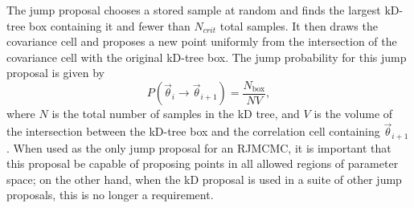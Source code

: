 \documentclass{iopart}
\newcommand{\vtheta}{\vec{\theta}}
\newcommand{\Nbox}{N_\mathrm{box}}
\newcommand{\Vbox}{V_\mathrm{box}}
\newcommand{\ee}{\end{equation}}
\newcommand{\bel}[1]{\begin{equation}\label{#1}}
\newcommand{\ilya}[1]{{\color{red} \bf #1}}
\begin{document}
The jump proposal chooses a stored sample at random and finds the largest kD-tree box containing it and fewer than $N_{crit}$ total samples. It then draws the covariance cell and proposes a new point uniformly from the intersection of the covariance cell with the original kD-tree box.
The jump probability for this jump proposal is given by
%
\bel{modforward} P(\vtheta_i \rightarrow \vtheta_{i+1}) =
\frac{\Nbox}{N V} , \ee
%
where $N$ is the total number of samples in the kD tree, and $V$ is the
volume of the intersection between the kD-tree box and the correlation cell containing $\vtheta_{i+1}$. When used as the only jump proposal for an
RJMCMC, it is important that this proposal be capable of
proposing points in all allowed regions of parameter space; on the
other hand, when the kD proposal is used in a suite of other jump proposals, this is no longer a requirement.

%
%
\end{document}
